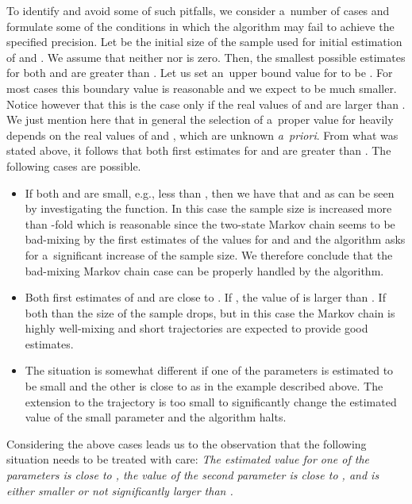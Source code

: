 \documentclass[runningheads,a4paper]{llncs}
\begin{document}
To identify and avoid some of such pitfalls, we consider a~number of cases and formulate some
of the conditions in which the algorithm may fail to achieve the specified precision.
Let  be the initial size of the sample used for initial estimation of  and .
We assume that neither  nor  is zero. Then, the smallest possible estimates for
both  and  are greater than . Let us set an~upper bound value for
 to be . For most cases this boundary value is reasonable and we expect  to be
much smaller. Notice however that this is the case only if the real values of  and 
are larger than . We just mention here that in general the selection of a~proper value
for  heavily depends on the real values of  and , which are unknown
\emph{a~priori}. From what was stated above, it follows that both first estimates for  and
 are greater than . The following cases are possible.
\begin{itemize}
  \item If both  and  are small, e.g., less than , then we have that
     and  as can be seen by investigating the
     function. In this case the sample size is increased more than -fold
    which is reasonable since the two-state Markov chain seems to be bad-mixing by the first
    estimates of the values for  and  and the algorithm asks for a~significant
    increase of the sample size. We therefore conclude that the bad-mixing Markov chain case can
    be properly handled by the algorithm.

  \item Both first estimates of  and  are close to . If , the value of  is larger than . If both  than the size of the sample drops, but in this case the Markov chain is highly
    well-mixing and short trajectories are expected to provide good estimates.

  \item The situation is somewhat different if one of the parameters is estimated to be small
    and the other is close to  as in the example described above. The extension to the
    trajectory is too small to significantly change the estimated value of the small parameter
    and the algorithm halts.
\end{itemize}

\noindent
Considering the above cases leads us to the observation that the following situation needs to be
treated with care:
  \emph{The estimated value for one of the parameters is close to , the value of
  the second parameter is close to , and  is either smaller or not
  significantly larger than .}
\end{document}
